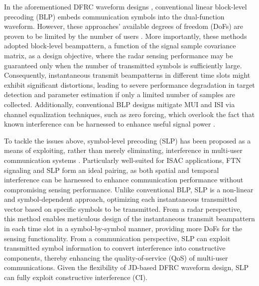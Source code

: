 \documentclass[lettersize,journal]{IEEEtran}
\newcommand{\nocolor}[1]{{\color{black}#1}}
\begin{document}
In the aforementioned DFRC waveform designs \cite{mccormick2017simultaneous,qian2018joint,tang2020waveform,kumari2019adaptive,liu2020range,liu2018toward,liu2018mu,cheng2020hybrid,yuan2020bayesian,xu2020multi,su2020secure,bazzi2023outage}, conventional linear block-level precoding (BLP) embeds communication symbols into the dual-function waveform. However, these approaches' available degrees of freedom (DoFs) are proven to be limited by the number of users \cite{liu2020joint1,chen2020composite,liu2020joint2}. More \nocolor{importantly}, these methods \nocolor{adopted block-level beampattern, a function of the signal sample covariance matrix, as a design objective, where the radar sensing performance may be guaranteed only when the number of transmitted symbols is sufficiently large.} Consequently, instantaneous transmit beampatterns in different time slots might exhibit significant distortions, leading to severe performance degradation in target detection and parameter estimation if only a limited number of samples are collected. Additionally, conventional BLP designs \nocolor{mitigate} MUI and ISI via channel equalization techniques, such as zero forcing, which overlook the fact that known interference can be \nocolor{harnessed} to enhance useful signal power \cite{spano2018faster}.

To tackle the issues above, symbol-level precoding (SLP) has been proposed as a means of exploiting, rather than merely eliminating, interference in multi-user communication systems \cite{masouros2009dynamic,masouros2015exploiting,alodeh2018symbol,li2020tutorial,liu2020joint3,liu2021intelligent}. \nocolor{Particularly well-suited for ISAC applications, FTN signaling and SLP form an ideal pairing, as both spatial and temporal interference can be harnessed to enhance communication performance without compromising sensing performance.} Unlike conventional BLP, SLP is a non-linear and symbol-dependent approach, optimizing each instantaneous transmitted vector based on specific symbols to be transmitted. \nocolor{From a radar perspective,} this method enables \nocolor{meticulous} design of the instantaneous transmit beampattern in each time slot in a symbol-by-symbol manner, providing more DoFs for the sensing functionality. From a communication perspective, SLP can exploit transmitted symbol information to convert interference into constructive components, thereby enhancing the quality-of-service (QoS) of multi-user communications. \nocolor{Given the flexibility of JD-based DFRC waveform design, SLP can fully exploit constructive interference (CI).} %
\end{document}

